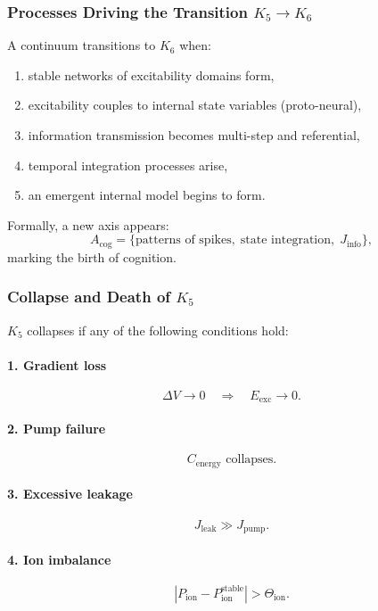 \subsubsection{Processes Driving the Transition \texorpdfstring{$K_5 \to K_6$}{K_5 \to K_6}}

A continuum transitions to $K_6$ when:
\begin{enumerate}
    \item stable networks of excitability domains form,
    \item excitability couples to internal state variables (proto-neural),
    \item information transmission becomes multi-step and referential,
    \item temporal integration processes arise,
    \item an emergent internal model begins to form.
\end{enumerate}

Formally, a new axis appears:
\[
A_{\text{cog}} = \{\text{patterns of spikes},\;
\text{state integration},\; J_{\text{info}}\},
\]
marking the birth of cognition.

\subsubsection{Collapse and Death of \texorpdfstring{$K_5$}{K_5}}

$K_5$ collapses if any of the following conditions hold:

\paragraph{1. Gradient loss}
\[
\Delta V \to 0 \quad\Rightarrow\quad E_{\text{exc}} \to 0.
\]

\paragraph{2. Pump failure}
\[
C_{\text{energy}} \text{ collapses}.
\]

\paragraph{3. Excessive leakage}
\[
J_{\text{leak}} \gg J_{\text{pump}}.
\]

\paragraph{4. Ion imbalance}
\[
|P_{\text{ion}} - P_{\text{ion}}^{\text{stable}}| > \Theta_{\text{ion}}.
\]

